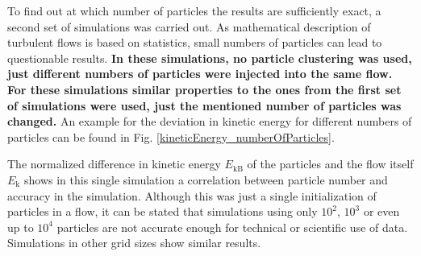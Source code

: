 \documentclass[11pt,a4paper,openany,oneside,parskip=half*]{article}
\begin{document}
To find out at which number of particles the results are sufficiently exact, a second set of simulations was carried out. As mathematical description of turbulent flows is based on statistics, small numbers of particles can lead to questionable results. \textbf{In these simulations, no particle clustering was used, just different numbers of particles were injected into the same flow. For these simulations similar properties to the ones from the first set of simulations were used, just the mentioned number of particles was changed.} An example for the deviation in kinetic energy for different numbers of particles can be found in Fig. \ref{kineticEnergy_numberOfParticles}. 

The normalized difference in kinetic energy $E_\mathrm{kB}$ of the particles and the flow itself $E_\mathrm{k}$ shows in this single simulation a correlation between particle number and accuracy in the simulation. Although this was just a single initialization of particles in a flow, it can be stated that simulations using only $10^2$, $10^3$ or even up to $10^4$ particles are not accurate enough for technical or scientific use of data. Simulations in other grid sizes show similar results.
\pagebreak
\end{document}

